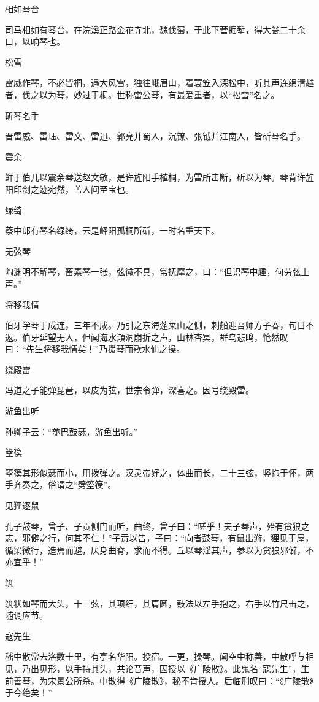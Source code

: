 \documentclass[a4paper,12pt,UTF8,twoside]{ctexbook}
\begin{document}
    相如琴台
    
    司马相如有琴台，在浣溪正路金花寺北，魏伐蜀，于此下营掘堑，得大瓮二十余口，以响琴也。
    
    松雪
    
    雷威作琴，不必皆桐，遇大风雪，独往峨眉山，着蓑笠入深松中，听其声连绵清越者，伐之以为琴，妙过于桐。世称雷公琴，有最爱重者，以“松雪”名之。
    
    斫琴名手
    
    晋雷威、雷珏、雷文、雷迅、郭亮并蜀人，沉镣、张钺并江南人，皆斫琴名手。
    
    震余
    
    鲜于伯几以震余琴送赵文敏，是许旌阳手植桐，为雷所击断，斫以为琴。琴背许旌阳印剑之迹宛然，盖人间至宝也。
    
    绿绮
    
    蔡中郎有琴名绿绮，云是峄阳孤桐所斫，一时名重天下。
    
    无弦琴
    
    陶渊明不解琴，畜素琴一张，弦徽不具，常抚摩之，曰：“但识琴中趣，何劳弦上声。”
    
    将移我情
    
    伯牙学琴于成连，三年不成。乃引之东海蓬莱山之侧，刺船迎吾师方子春，旬日不返。伯牙延望无人，但闻海水澒洞崩折之声，山林杏冥，群鸟悲鸣，怆然叹曰：“先生将移我情矣！”乃援琴而歌水仙之操。
    
    绕殿雷
    
    冯道之子能弹琵琶，以皮为弦，世宗令弹，深喜之。因号绕殿雷。
    
    游鱼出听
    
    孙卿子云：“匏巴鼓瑟，游鱼出听。”
    
    箜篌
    
    箜篌其形似瑟而小，用拨弹之。汉灵帝好之，体曲而长，二十三弦，竖抱于怀，两手齐奏之，俗谓之“劈箜篌”。
    
    见狸逐鼠
    
    孔子鼓琴，曾子、子贡侧门而听，曲终，曾子曰：“嗟乎！夫子琴声，殆有贪狼之志，邪僻之行，何其不仁！”子贡以告，子曰：“向者鼓琴，有鼠出游，狸见于屋，循梁微行，造焉而避，厌身曲脊，求而不得。丘以琴淫其声，参以为贪狼邪僻，不亦宜乎！”
    
    筑
    
    筑状如琴而大头，十三弦，其项细，其肩圆，鼓法以左手抱之，右手以竹尺击之，随调应节。
    
    寇先生
    
    嵇中散常去洛数十里，有亭名华阳。投宿。一更，操琴。闻空中称善，中散呼与相见，乃出见形，以手持其头，共论音声，因授以《广陵散》。此鬼名“寇先生”，生前善琴，为宋景公所杀。中散得《广陵散》，秘不肯授人。后临刑叹曰：“《广陵散》于今绝矣！”
    
\end{document}
